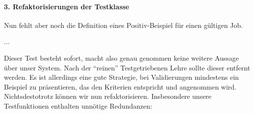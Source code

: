 \paragraph{3. Refaktorisierungen der Testklasse}
Nun fehlt aber noch die Definition eines Positiv-Beispiel für einen gültigen Job.

\begin{ruby}[label=test/unit/job\_test.rb]
...
  
          
   
\end{ruby}
\tddgreen
Dieser Test besteht sofort, macht also genau genommen keine weitere Aussage über unser System. Nach der "`reinen"' Testgetriebenen Lehre sollte dieser entfernt werden. Es ist allerdings eine gute Strategie, bei Validierungen mindestens ein Beispiel zu präsentieren, das den Kriterien entspricht und angenommen wird. Nichtsdestotrotz können wir nun refaktorisieren. Insbesondere unsere Testfunktionen enthalten unnötige Redundanzen:

